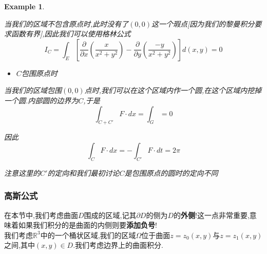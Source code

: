 \documentclass[11pt,hyperref,a4paper,UTF8]{ctexart}
\newtheorem{example}{Example}[subsection]
\newcommand{\RR}{\mathbb{R}}
\newcommand{\parameter}[1]{\left(#1\right)}
\newcommand{\bracket}[1]{\left[#1\right]}
\begin{document}
\begin{CJK}{UTF8}{gkai}
\begin{example}
  \begin{center}
  
\end{center}
  当我们的区域不包含原点时,此时没有了$(0,0)$这一个瑕点[因为我们的黎曼积分要求函数有界],因此我们可以使用格林公式
  \[I_C  = \int_E \bracket{\frac{\partial}{\partial x}\parameter{\frac{x}{x^2 + y^2}} - \frac{\partial}{\partial y} \parameter{\frac{-y}{x^2 + y^2}}} d(x,y) = 0\]

  \begin{itemize}
    \item $C$包围原点时
  \end{itemize}
  当我们的区域包围$(0,0)$点时,我们可以在这个区域内作一个圆,在这个区域内挖掉一个圆.内部圆的边界为$C$,于是
  \[\int_{C + C'} F\cdot dx = \int_G = 0\]

  因此
  \[\int_C F \cdot dx = - \int_{C'} F\cdot dt = 2\pi\]

  注意这里的$C'$的定向和我们最初讨论$C$是包围原点的圆时的定向不同
\end{example}
\subsubsection{高斯公式}

在本节中,我们考虑曲面$D$围成的区域,记其$\partial D$的侧为$D$的\textbf{外侧}!这一点非常重要,意味着如果我们积分的是曲面的内侧则要\textbf{添加负号}!\\

我们考虑$\RR^3$中的一个桶状区域,我们的区域$\Omega$位于曲面$z = z_0(x,y)$与$z = z_1(x,y)$之间,其中$(x,y) \in D$.我们考虑边界上的曲面积分.\\


\end{CJK}
\end{document}
